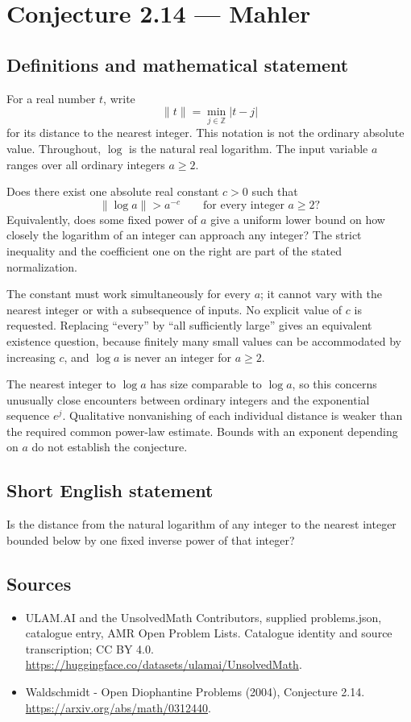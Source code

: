 \documentclass[11pt,a4paper]{article}
\begin{document}
\section*{Conjecture 2.14 — Mahler}\label{statement}

\subsection{Definitions and mathematical statement}
For a real number $t$, write
\[
\|t\|=\min_{j\in\mathbb Z}|t-j|
\]
for its distance to the nearest integer. This notation is not the ordinary absolute value. Throughout, $\log$ is the natural real logarithm. The input variable $a$ ranges over all ordinary integers $a\ge2$.

Does there exist one absolute real constant $c>0$ such that
\[
\|\log a\|>a^{-c}\qquad\text{for every integer }a\ge2?
\]
Equivalently, does some fixed power of $a$ give a uniform lower bound on how closely the logarithm of an integer can approach any integer? The strict inequality and the coefficient one on the right are part of the stated normalization.

The constant must work simultaneously for every $a$; it cannot vary with the nearest integer or with a subsequence of inputs. No explicit value of $c$ is requested. Replacing ``every'' by ``all sufficiently large'' gives an equivalent existence question, because finitely many small values can be accommodated by increasing $c$, and $\log a$ is never an integer for $a\ge2$.

The nearest integer to $\log a$ has size comparable to $\log a$, so this concerns unusually close encounters between ordinary integers and the exponential sequence $e^j$. Qualitative nonvanishing of each individual distance is weaker than the required common power-law estimate. Bounds with an exponent depending on $a$ do not establish the conjecture.
\subsection{Short English statement}
Is the distance from the natural logarithm of any integer to the nearest integer bounded below by one fixed inverse power of that integer?
\subsection{Sources}
\begin{itemize}
\item[S1] ULAM.AI and the UnsolvedMath Contributors, supplied problems.json, catalogue entry, AMR Open Problem Lists. Catalogue identity and source transcription; CC BY 4.0.
\url{https://huggingface.co/datasets/ulamai/UnsolvedMath}.
\item[S2] Waldschmidt - Open Diophantine Problems (2004), Conjecture 2.14. 
\url{https://arxiv.org/abs/math/0312440}.
\end{itemize}
\end{document}
